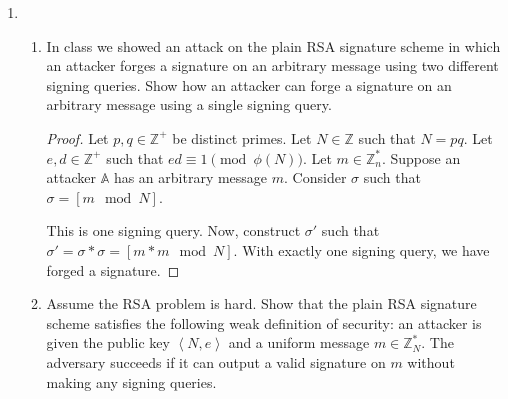 \documentclass{article}
\begin{document}
\begin{enumerate}
\begin{proof}
      Suppose $E(x) = x^e \mod{n}$, and suppose $eh \equiv 1 \pmod{p - 1}$.
      Then, suppose $D(E(x)) = x$.

      Then $D(x^e \mod n) = x$.

      Consider $x^h$. Since $p \mid pq, x^h \mod p \equiv x^h \mod{pq}$. Since
      $n = pq$, $D(x^e \mod{pq}) = x$.

      We supposed that $eh \equiv 1 \pmod{p - 1}$. Since $p - 1 \mid (p - 1)(q -
      1)$, and $p \mid pq$, $D(x^e \mod{pq}) = D(x^e \mod{p}) = x$.

      Since $e$ and $h$ are inverses. $D(x^e \mod{p}) = e^{en} \mod{p} = x$. So,
      $D(x) = x^h \mod{p}$.
    \end{proof}
  \item
    \begin{enumerate}
      \item In class we showed an attack on the plain RSA signature scheme in
        which an attacker forges a signature on an arbitrary message using two
        different signing queries. Show how an attacker can forge a signature on
        an arbitrary message using a single signing query.

        \begin{proof}
          Let $p, q \in \mathbb{Z}^{+}$ be distinct primes. Let $N \in
          \mathbb{Z}$ such that $N = pq$. Let $e, d \in \mathbb{Z}^{+}$ such
          that $ed \equiv 1 \pmod{\phi(N)}$. Let $m \in \mathbb{Z}^{*}_n$.
          Suppose an attacker $\mathbb{A}$ has an arbitrary message $m$.
          Consider $\sigma$ such that $\sigma = \left[m \mod N\right]$.

          This is one signing query. Now, construct $\sigma'$ such that $\sigma'
          = \sigma * \sigma = \left[m * m \mod N\right]$. With exactly one
          signing query, we have forged a signature.
        \end{proof}
      \item Assume the RSA problem is hard. Show that the plain RSA signature
        scheme satisfies the following weak definition of security: an attacker
        is given the public key $\left<N, e\right>$ and a uniform message $m \in
        \mathbb{Z}^{*}_N$. The adversary succeeds if it can output a valid
        signature on $m$ without making any signing queries.


\end{enumerate}
\end{enumerate}
\end{document}
